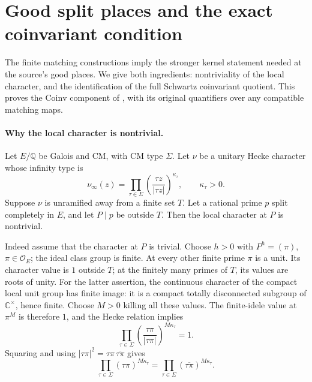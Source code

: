\section{Good split places and the exact coinvariant condition}
\label{sec:sr-good-split-coinvariants}

The finite matching constructions imply the stronger kernel
statement needed at the source's good places.  We give both
ingredients: nontriviality of the local character, and the
identification of the full Schwartz coinvariant quotient.
This proves the \(\mathrm{Coinv}\) component of
, with its original quantifiers
over any compatible matching maps.

\paragraph{Why the local character is nontrivial.}
Let \(E/\mathbb Q\) be Galois and CM, with CM type \(\Sigma\).
Let \(\nu\) be a unitary Hecke character whose infinity type is
\[
        \nu_\infty(z)=
          \prod_{\tau\in\Sigma}
             \left(\frac{\tau z}{|\tau z|}\right)^{\kappa_\tau},
                       \qquad \kappa_\tau>0.
\]
Suppose \(\nu\) is unramified away from a finite set \(T\).
Let a rational prime \(p\) split completely in \(E\), and
let \(P\mid p\) be outside \(T\).  Then the local
character at \(P\) is nontrivial.

Indeed assume that the character at \(P\) is trivial.
Choose \(h>0\) with \(P^h=(\pi)\), \(\pi\in\mathcal O_E\);
the ideal class group is finite.  At every other finite
prime \(\pi\) is a unit.  Its character value is \(1\) outside
\(T\); at the finitely many primes of \(T\), its values are
roots of unity.  For the latter assertion, the continuous
character of the compact local unit group has finite image:
it is a compact totally disconnected subgroup of
\(\mathbb C^\times\), hence finite.  Choose \(M>0\) killing
all these values.  The finite-idele value at \(\pi^M\) is
therefore \(1\), and the Hecke relation implies
\[
        \prod_{\tau\in\Sigma}
          \left(\frac{\tau\pi}{|\tau\pi|}\right)^{M\kappa_\tau}
                          =1.
\]
Squaring and using
\(|\tau\pi|^2=\tau\pi\,\overline{\tau\pi}\) gives
\begin{equation}
 \prod_{\tau\in\Sigma}(\tau\pi)^{M\kappa_\tau}
     =\prod_{\tau\in\Sigma}(\overline{\tau\pi})^{M\kappa_\tau}.
 \label{eq:sr-good-character-contradiction}
\end{equation}

